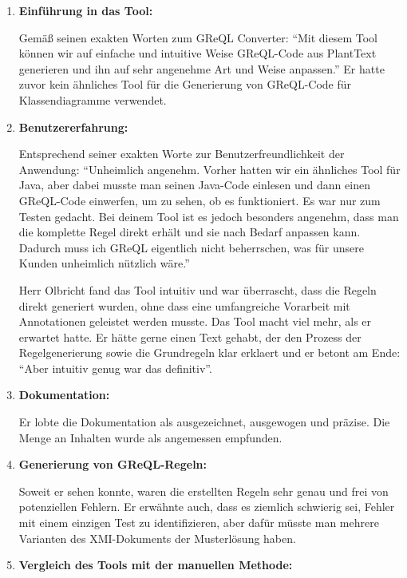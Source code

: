 \begin{enumerate}[itemsep=8pt, parsep=5pt]
    \item \textbf{Einführung in das Tool:}

    Gemäß seinen exakten Worten zum GReQL Converter: ``Mit diesem Tool können wir auf einfache und intuitive Weise
    GReQL-Code aus PlantText generieren und ihn auf sehr angenehme Art und Weise anpassen.'' Er hatte zuvor kein
    ähnliches Tool für die Generierung von GReQL-Code für Klassendiagramme verwendet.

    \item \textbf{Benutzererfahrung:}

    Entsprechend seiner exakten Worte zur Benutzerfreundlichkeit der Anwendung: ``Unheimlich angenehm. Vorher hatten wir
    ein ähnliches Tool für Java, aber dabei musste man seinen Java-Code einlesen und dann einen GReQL-Code einwerfen,
    um zu sehen, ob es funktioniert. Es war nur zum Testen gedacht. Bei deinem Tool ist es jedoch besonders angenehm,
    dass man die komplette Regel direkt erhält und sie nach Bedarf anpassen kann. Dadurch muss ich GReQL eigentlich
    nicht beherrschen, was für unsere Kunden unheimlich nützlich wäre.''

    Herr Olbricht fand das Tool intuitiv und war überrascht, dass die Regeln direkt generiert wurden, ohne dass eine
    umfangreiche Vorarbeit mit Annotationen geleistet werden musste. Das Tool macht viel mehr, als er erwartet hatte.
    Er hätte gerne einen Text gehabt, der den Prozess der Regelgenerierung sowie die Grundregeln klar erklaert und er
    betont am Ende: ``Aber intuitiv genug war das definitiv''.

    \item \textbf{Dokumentation:}

    Er lobte die Dokumentation als ausgezeichnet, ausgewogen und präzise. Die Menge an Inhalten wurde als angemessen empfunden.
    
    \item \textbf{Generierung von GReQL-Regeln:}

    Soweit er sehen konnte, waren die erstellten Regeln sehr genau und frei von potenziellen Fehlern. Er erwähnte auch,
    dass es ziemlich schwierig sei, Fehler mit einem einzigen Test zu identifizieren, aber dafür müsste man mehrere 
    Varianten des XMI-Dokuments der Musterlösung haben.
    
    \item \textbf{Vergleich des Tools mit der manuellen Methode:}


\end{enumerate}
